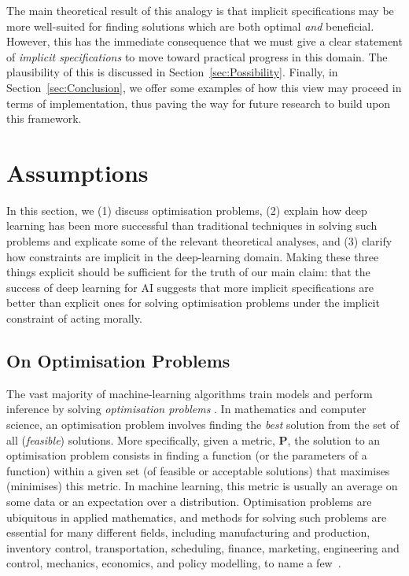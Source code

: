 \documentclass{amsart}
\theoremstyle{indented}
\theoremstyle{indentedProp}
\theoremstyle{indented}
\theoremstyle{indented}
\theoremstyle{indented}
\theoremstyle{indented}
\theoremstyle{indented}
\begin{document}
The main theoretical result of this analogy is that implicit specifications may be more well-suited for finding solutions which are both optimal {\it and} beneficial. However, this has the immediate consequence that we must give a clear statement of {\it implicit specifications} to move toward practical progress in this domain. The plausibility of this is discussed in Section~\ref{sec:Possibility}. Finally, in Section~\ref{sec:Conclusion}, we offer some examples of how this view may proceed in terms of implementation, thus paving the way for future research to build upon this framework.

\section{Assumptions}
\label{sec:Assumptions}

In this section, we (1) discuss optimisation problems, (2) explain how deep learning has been more successful than traditional techniques in solving such problems and explicate some of the relevant theoretical 
analyses, and (3) clarify how constraints are implicit in the deep-learning domain. Making these three things explicit should be sufficient for the truth of our main claim: that the success of deep learning for AI suggests that more implicit specifications are better than explicit ones for solving optimisation problems under the implicit constraint of acting morally.

\subsection{On Optimisation Problems}
\label{sec:Assumption1}

The vast majority of machine-learning algorithms train models and perform inference by solving {\it optimisation problems} \citep{MurphyBook2012,Goodfellow-et-al-2016}. In mathematics and computer science, an optimisation problem involves finding the {\it best} solution from the set of all ({\it feasible}) solutions. More specifically, given a metric, $\mathbf{P}$, the solution to an optimisation problem consists in finding a function (or the parameters of a function) within a given set (of feasible or acceptable solutions) that maximises (minimises) this metric. In machine learning, this metric is usually an average on some data or an expectation over a distribution. Optimisation problems are ubiquitous in applied mathematics, and methods for solving such problems are essential for many different fields, including manufacturing and production, inventory control, transportation, scheduling, finance, marketing, engineering and control, mechanics, economics, and policy modelling, to name a few~\citep{NumOptBook}. 
\end{document}
